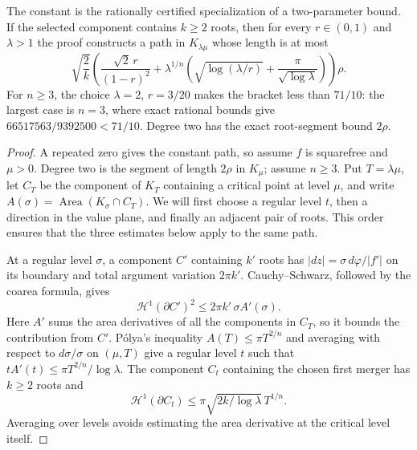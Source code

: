 The constant is the rationally certified specialization of a two-parameter
bound.  If the selected component contains $k\ge2$ roots, then for
every $r\in(0,1)$ and $\lambda>1$ the proof constructs a path in
$K_{\lambda\mu}$ whose length is at most
\[
 \sqrt{\frac2k}\left(
   \frac{\sqrt2\,r}{(1-r)^2}
   +\lambda^{1/n}\left(
      \sqrt{\log(\lambda/r)}+
      \frac{\pi}{\sqrt{\log\lambda}}
    \right)
 \right)\rho.                                      \tag{CF}
\]
For $n\ge3$, the choice $\lambda=2$, $r=3/20$ makes the bracket less
than $71/10$: the largest case is $n=3$, where exact rational bounds give
$66517563/9392500<71/10$.  Degree two has the exact root-segment bound
$2\rho$.

\begin{proof}
A repeated zero gives the constant path, so assume $f$ is squarefree and
$\mu>0$. Degree two is the segment of length $2\rho$ in $K_\mu$; assume
$n\ge3$. Put $T=\lambda\mu$, let $C_T$ be the component of $K_T$
containing a critical point at level $\mu$, and write
$A(\sigma)=\operatorname{Area}(K_\sigma\cap C_T)$.
We will first choose a regular level $t$, then a direction in the value
plane, and finally an adjacent pair of roots. This order ensures that
the three estimates below apply to the same path.

At a regular level $\sigma$, a component $C'$ containing $k'$ roots has
$|dz|=\sigma\,d\varphi/|f'|$ on its boundary and total argument variation
$2\pi k'$. Cauchy--Schwarz, followed by the coarea formula, gives
\[
 \mathcal H^1(\partial C')^2\le2\pi k'\,\sigma A'(\sigma).
                                                        \tag{CF1}
\]
Here $A'$ sums the area derivatives of all the components in $C_T$,
so it bounds the contribution from $C'$. P\'olya's inequality
$A(T)\le\pi T^{2/n}$ \cite[Theorem~1]{crane} and averaging with respect
to $d\sigma/\sigma$ on $(\mu,T)$ give a regular level $t$ such that
$tA'(t)\le\pi T^{2/n}/\log\lambda$. The component $C_t$ containing
the chosen first merger has $k\ge2$ roots and
\[
 \mathcal H^1(\partial C_t)
 \le\pi\sqrt{2k/\log\lambda}\,T^{1/n}.
\]
Averaging over levels avoids estimating the area derivative at the
critical level itself.


\end{proof}
